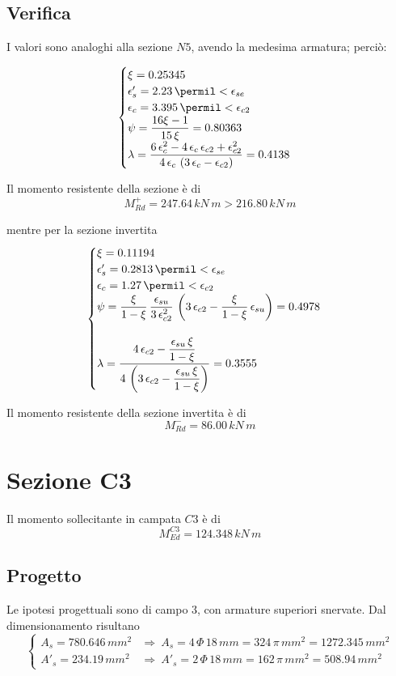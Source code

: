 \subsection{Verifica}
I valori sono analoghi alla sezione $N5$, avendo la medesima armatura; perciò:

\[
\begin{cases}
	\xi = 0.25345\\
	\epsilon'_s = 2.23\,\permil < \epsilon_{se}\\
	\epsilon_c = 3.395\,\permil < \epsilon_{c2}\\
	\psi =\dfrac{16\xi -1}{15\,\xi} = 0.80363\\
	\lambda = \dfrac{6\,\epsilon_{c}^2 - 4\,\epsilon_{c}\,\epsilon_{c2} + \epsilon_{c2}^2}{4\,\epsilon_{c}\,\left(3\,\epsilon_c - \epsilon_{c2}\right)} = 0.4138
\end{cases}
\]

Il momento resistente della sezione è di
\[
M_{Rd}^+ = 247.64\,kN\,m > 216.80\,kN\,m
\]

mentre per la sezione invertita
\[
\begin{cases}
	\xi = 0.11194\\
	\epsilon'_s = 0.2813\,\permil < \epsilon_{se}\\
	\epsilon_c = 1.27\,\permil < \epsilon_{c2}\\
	\psi = \dfrac{\xi}{1-\xi}\,\dfrac{\epsilon_{su}}{3\,\epsilon_{c2}^2}\,\left(3\,\epsilon_{c2} - \dfrac{\xi}{1-\xi}\,\epsilon_{su}\right) = 0.4978\\\\
	\lambda = \dfrac{4\,\epsilon_{c2} - \dfrac{\epsilon_{su}\,\xi}{1-\xi}}{4\,\left(3\,\epsilon_{c2} - \dfrac{\epsilon_{su}\,\xi}{1-\xi}\right)} = 0.3555
\end{cases}
\]

Il momento resistente della sezione invertita è di
\[
M_{Rd}^- = 86.00\,kN\,m
\]

\section{Sezione C3}
Il momento sollecitante in campata $C3$ è di 
\[
M_{Ed}^{C3} = 124.348\,kN\,m
\]
\subsection{Progetto}
Le ipotesi progettuali sono di campo 3, con armature superiori snervate. Dal dimensionamento risultano
\[
\begin{cases}
	A_s = 780.646\,mm^2 &\Longrightarrow~A_s = 4\,\Phi\,18\,mm = 324\,\pi\,mm^2 = 1272.345\,mm^2\\
	A'_s = 234.19\,mm^2 &\Longrightarrow~ A'_s = 2\,\Phi\,18\,mm = 162\,\pi\,mm^2 = 508.94\,mm^2
\end{cases}
\]

